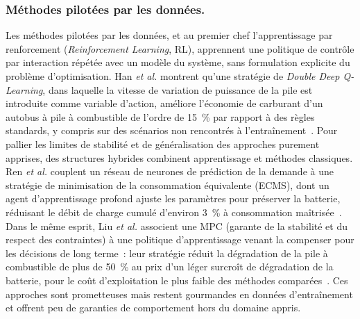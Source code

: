 \subsubsection{Méthodes pilotées par les données.}
Les méthodes pilotées par les données, et au premier chef l'apprentissage par renforcement (\textit{Reinforcement Learning}, RL), apprennent une politique de contrôle par interaction répétée avec un modèle du système, sans formulation explicite du problème d'optimisation.
Han \textit{et al.} montrent qu'une stratégie de \textit{Double Deep Q-Learning}, dans laquelle la vitesse de variation de puissance de la pile est introduite comme variable d'action, améliore l'économie de carburant d'un autobus à pile à combustible de l'ordre de 15~\% par rapport à des règles standards, y compris sur des scénarios non rencontrés à l'entraînement~\cite{han_reinforcement_2025}.
Pour pallier les limites de stabilité et de généralisation des approches purement apprises, des structures hybrides combinent apprentissage et méthodes classiques.
Ren \textit{et al.} couplent un réseau de neurones de prédiction de la demande à une stratégie de minimisation de la consommation équivalente (ECMS), dont un agent d'apprentissage profond ajuste les paramètres pour préserver la batterie, réduisant le débit de charge cumulé d'environ 3~\% à consommation maîtrisée~\cite{ren_battery_2024}.
Dans le même esprit, Liu \textit{et al.} associent une MPC (garante de la stabilité et du respect des contraintes) à une politique d'apprentissage venant la compenser pour les décisions de long terme~: leur stratégie réduit la dégradation de la pile à combustible de plus de 50~\% au prix d'un léger surcroît de dégradation de la batterie, pour le coût d'exploitation le plus faible des méthodes comparées~\cite{liu_novel_2025}.
Ces approches sont prometteuses mais restent gourmandes en données d'entraînement et offrent peu de garanties de comportement hors du domaine appris.

